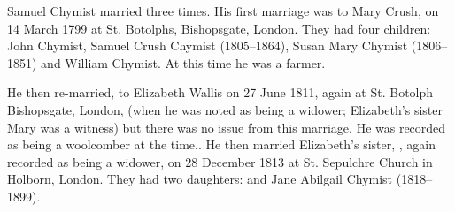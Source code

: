 

Samuel Chymist married three times. His first marriage was to Mary Crush, on 14 March 1799 at St. Botolphs, Bishopsgate, London. They had four children: John Chymist, Samuel Crush Chymist (1805--1864), Susan Mary Chymist (1806--1851) and William Chymist.  At this time he was a farmer. \cite{SChymistMarriage}

He then re-married, to Elizabeth Wallis on 27 June 1811, again at St. Botolph Bishopsgate, London, (when he was noted as being a widower; Elizabeth's sister Mary was a witness) but there was no issue from this marriage.  He was recorded as being a woolcomber at the time.\cite{SChymistMarriage2}.  He then married Elizabeth's sister, , again recorded as being a widower, on 28 December 1813 at St. Sepulchre Church in Holborn, London.\cite{SChymistMarriage3} They had two daughters:  and Jane Abilgail Chymist (1818--1899).
